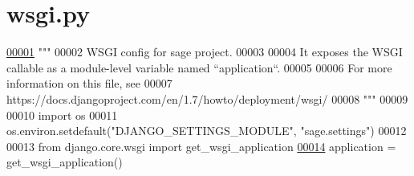 \hypertarget{wsgi_8py_source}{}\section{wsgi.\+py}
\label{wsgi_8py_source}

\begin{DoxyCode}
\hypertarget{wsgi_8py_source_l00001}{}\hyperlink{namespacesage_1_1wsgi}{00001} \textcolor{stringliteral}{"""}
00002 \textcolor{stringliteral}{WSGI config for sage project.}
00003 \textcolor{stringliteral}{}
00004 \textcolor{stringliteral}{It exposes the WSGI callable as a module-level variable named ``application``.}
00005 \textcolor{stringliteral}{}
00006 \textcolor{stringliteral}{For more information on this file, see}
00007 \textcolor{stringliteral}{https://docs.djangoproject.com/en/1.7/howto/deployment/wsgi/}
00008 \textcolor{stringliteral}{"""}
00009 
00010 \textcolor{keyword}{import} os
00011 os.environ.setdefault(\textcolor{stringliteral}{"DJANGO\_SETTINGS\_MODULE"}, \textcolor{stringliteral}{"sage.settings"})
00012 
00013 \textcolor{keyword}{from} django.core.wsgi \textcolor{keyword}{import} get\_wsgi\_application
\hypertarget{wsgi_8py_source_l00014}{}\hyperlink{namespacesage_1_1wsgi_a1ddb23bace7377dbda42c61a804bb9aa}{00014} application = get\_wsgi\_application()
\end{DoxyCode}
